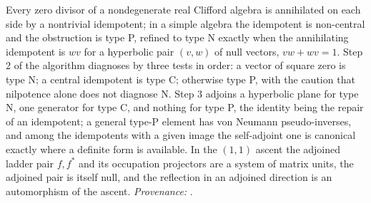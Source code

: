 Every zero divisor of a nondegenerate real Clifford algebra is annihilated on each side by a nontrivial idempotent; in a simple algebra the idempotent is non-central and the obstruction is type P, refined to type N exactly when the annihilating idempotent is $wv$ for a hyperbolic pair $(v, w)$ of null vectors, $vw + wv = 1$. Step 2 of the algorithm diagnoses by three tests in order: a vector of square zero is type N; a central idempotent is type C; otherwise type P, with the caution that nilpotence alone does not diagnose N. Step 3 adjoins a hyperbolic plane for type N, one generator for type C, and nothing for type P, the identity being the repair of an idempotent; a general type-P element has von Neumann pseudo-inverses, and among the idempotents with a given image the self-adjoint one is canonical exactly where a definite form is available. In the $(1,1)$ ascent the adjoined ladder pair $f, f^{*}$ and its occupation projectors are a system of matrix units, the adjoined pair is itself null, and the reflection in an adjoined direction is an automorphism of the ascent. \emph{Provenance:} \cite[Def.~3.1, Ex.~3.5, Thm.~3.9, Thm.~4.2, Rem.~5.8, Prop.~6.1, Rem.~6.6, Thm.~7.1, Prop.~7.8, Table~1]{ButlerT1}.
